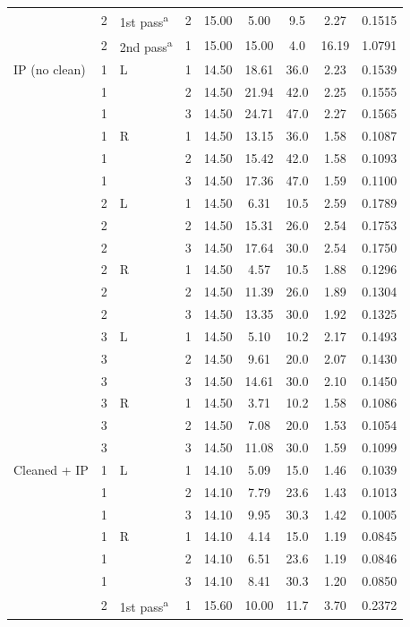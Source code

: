 {\begin{longtable}{lllcccccc}
    \addlinespace[2pt]
     & 2 & 1st pass\textsuperscript{a} & 2 & 15.00 & 5.00 & 9.5 & 2.27 & 0.1515 \\
    \addlinespace[2pt]
     & 2 & 2nd pass\textsuperscript{a} & 1 & 15.00 & 15.00 & 4.0 & 16.19 & 1.0791 \\
    \midrule
    IP (no clean) & 1 & L & 1 & 14.50 & 18.61 & 36.0 & 2.23 & 0.1539 \\
     & 1 &  & 2 & 14.50 & 21.94 & 42.0 & 2.25 & 0.1555 \\
     & 1 &  & 3 & 14.50 & 24.71 & 47.0 & 2.27 & 0.1565 \\
    \addlinespace[2pt]
     & 1 & R & 1 & 14.50 & 13.15 & 36.0 & 1.58 & 0.1087 \\
     & 1 &  & 2 & 14.50 & 15.42 & 42.0 & 1.58 & 0.1093 \\
     & 1 &  & 3 & 14.50 & 17.36 & 47.0 & 1.59 & 0.1100 \\
    \addlinespace[2pt]
     & 2 & L & 1 & 14.50 & 6.31 & 10.5 & 2.59 & 0.1789 \\
     & 2 &  & 2 & 14.50 & 15.31 & 26.0 & 2.54 & 0.1753 \\
     & 2 &  & 3 & 14.50 & 17.64 & 30.0 & 2.54 & 0.1750 \\
    \addlinespace[2pt]
     & 2 & R & 1 & 14.50 & 4.57 & 10.5 & 1.88 & 0.1296 \\
     & 2 &  & 2 & 14.50 & 11.39 & 26.0 & 1.89 & 0.1304 \\
     & 2 &  & 3 & 14.50 & 13.35 & 30.0 & 1.92 & 0.1325 \\
    \addlinespace[2pt]
     & 3 & L & 1 & 14.50 & 5.10 & 10.2 & 2.17 & 0.1493 \\
     & 3 &  & 2 & 14.50 & 9.61 & 20.0 & 2.07 & 0.1430 \\
     & 3 &  & 3 & 14.50 & 14.61 & 30.0 & 2.10 & 0.1450 \\
    \addlinespace[2pt]
     & 3 & R & 1 & 14.50 & 3.71 & 10.2 & 1.58 & 0.1086 \\
     & 3 &  & 2 & 14.50 & 7.08 & 20.0 & 1.53 & 0.1054 \\
     & 3 &  & 3 & 14.50 & 11.08 & 30.0 & 1.59 & 0.1099 \\
    \midrule
    Cleaned + IP & 1 & L & 1 & 14.10 & 5.09 & 15.0 & 1.46 & 0.1039 \\
     & 1 &  & 2 & 14.10 & 7.79 & 23.6 & 1.43 & 0.1013 \\
     & 1 &  & 3 & 14.10 & 9.95 & 30.3 & 1.42 & 0.1005 \\
    \addlinespace[2pt]
     & 1 & R & 1 & 14.10 & 4.14 & 15.0 & 1.19 & 0.0845 \\
     & 1 &  & 2 & 14.10 & 6.51 & 23.6 & 1.19 & 0.0846 \\
     & 1 &  & 3 & 14.10 & 8.41 & 30.3 & 1.20 & 0.0850 \\
    \addlinespace[2pt]
     & 2 & 1st pass\textsuperscript{a} & 1 & 15.60 & 10.00 & 11.7 & 3.70 & 0.2372 \\
  \bottomrule
\end{longtable}}

